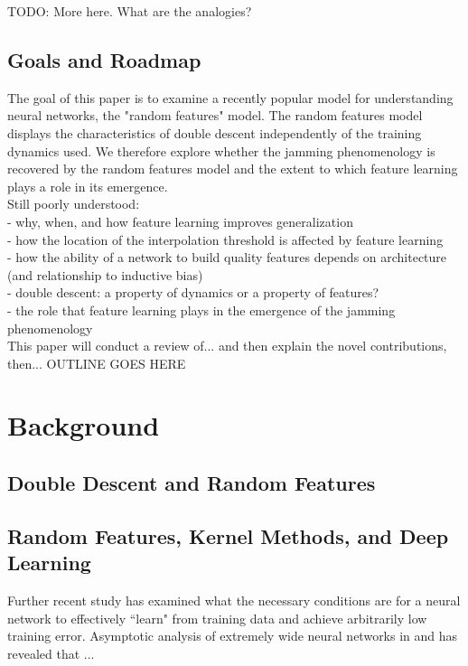 \documentclass[a4paper, 12pt]{article}
\begin{document}
TODO: More here. What are the analogies? 

\subsection{Goals and Roadmap}

The goal of this paper is to examine a recently popular model for understanding neural networks, the "random features" model. The random features model displays the characteristics of double descent independently of the training dynamics used. We therefore explore whether the jamming phenomenology is recovered by the random features model and the extent to which feature learning plays a role in its emergence.\\


Still poorly understood:\\
- why, when, and how feature learning improves generalization\\
- how the location of the interpolation threshold is affected by feature learning\\
- how the ability of a network to build quality features depends on architecture (and relationship to inductive bias) \\
- double descent: a property of dynamics or a property of features?\\
- the role that feature learning plays in the emergence of the jamming phenomenology\\

This paper will conduct a review of... and then explain the novel contributions, then... OUTLINE GOES HERE

\section{Background}

\subsection{Double Descent and Random Features}

\subsection{Random Features, Kernel Methods, and Deep Learning}
Further recent study has examined what the necessary conditions are for a neural network to effectively ``learn" from training data and achieve arbitrarily low training error. Asymptotic analysis of extremely wide neural networks in \cite{jacotNeuralTangentKernel2018} and \cite{leeWideNeuralNetworks2019} has revealed that ...
\end{document}

